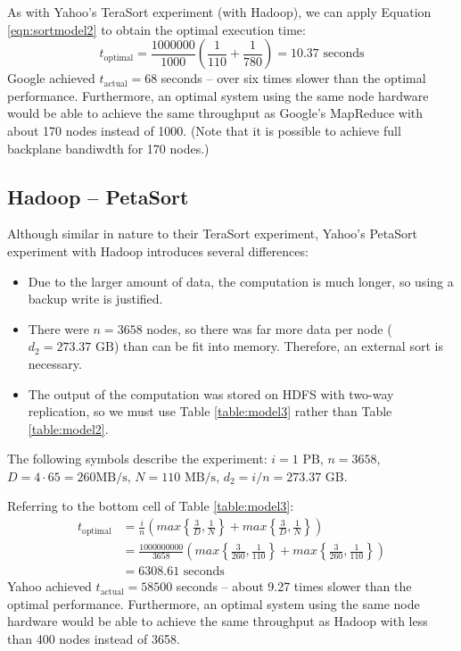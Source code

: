 \documentclass{acm_proc_article-sp}
\begin{document}
As with Yahoo's TeraSort experiment (with Hadoop), we can apply Equation \ref{eqn:sortmodel2} to obtain the optimal execution time:
\[t_\text{optimal} = \frac{1000000}{1000} \left( \frac{1}{110} + \frac{1}{780}
\right) = 10.37 \text{ seconds}\]
Google achieved $t_\text{actual} = 68$
seconds -- over six times slower than the optimal performance. Furthermore, an
optimal system using
the same node hardware would be able to achieve the same throughput as Google's
MapReduce with about 170 nodes instead of 1000. (Note that it is possible to achieve full
backplane bandiwdth for 170 nodes.)

\subsection{Hadoop -- PetaSort}
Although similar in nature to their TeraSort experiment, Yahoo's PetaSort experiment with Hadoop introduces several differences:
\begin{itemize}
  \item Due to the larger amount of data, the computation is much longer, so
  using a backup write is justified.
  \item There were $n = 3658$ nodes, so there was far more data per node ($d_2 = 273.37 \text{ GB}$) than can be fit into memory. Therefore, an external sort is necessary.
  \item The output of the computation was stored on HDFS with two-way replication, so we must use Table \ref{table:model3} rather than Table \ref{table:model2}.
\end{itemize}

The following symbols describe
the experiment: $i = 1 \text{ PB}$, $n = 3658$, $D = 4 \cdot 65 = 260 \text{
MB/s}$, $N = 110 \text{ MB/s}$, $d_2 = i/n = 273.37 \text{ GB}$.

Referring to the bottom cell of Table \ref{table:model3}:
\begin{align*}
t_\text{optimal} &= \frac{i}{n} \left( max\left\{\frac{3}{D}, \frac{1}{N}\right\} + max\left\{\frac{3}{D}, \frac{1}{N}\right\} \right)\\
  &= \frac{1000000000}{3658} \left( max\left\{\frac{3}{260}, \frac{1}{110}\right\} + max\left\{\frac{3}{260}, \frac{1}{110}\right\} \right)\\
  &= 6308.61 \text{ seconds}
\end{align*}
Yahoo achieved $t_\text{actual} = 58500$ seconds -- about 9.27 times slower
than the optimal performance. Furthermore, an
optimal system using the same node hardware would be able to
achieve the same throughput as Hadoop with less than 400
nodes instead of 3658.
\end{document}
